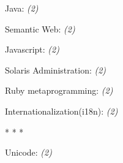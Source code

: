 \documentclass[]{article}
\begin{document}
 Java: \emph{(2)}
  \label{java2}

       

 Semantic Web: \emph{(2)}
  \label{semanticweb2}

       

 Javascript: \emph{(2)}
  \label{javascript2}

       

 Solaris Administration: \emph{(2)}
  \label{solarisadministration2}

       

 Ruby metaprogramming: \emph{(2)}
  \label{rubymetaprogramming2}

       

 Internationalization(i18n): \emph{(2)}
  \label{internationalization(i18n)2}

       

 \begin{center}* * * \end{center}
 Unicode: \emph{(2)}
  \label{unicode2}

       
\end{document}
